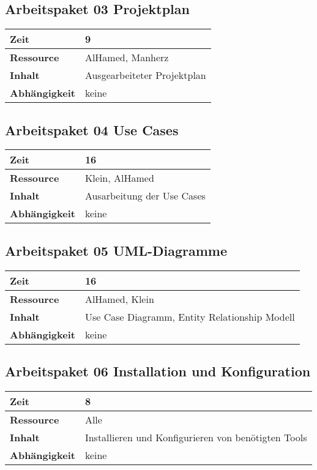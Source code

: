 \documentclass[12pt,a4paper,onecolumn]{article}
\begin{document}
\subsection{Arbeitspaket 03 Projektplan}
\begin{tabularx}{\textwidth}{|l|X|}
\hline
     \textbf{Zeit} &  9\\
     \hline
     \textbf{Ressource} & AlHamed, Manherz\\
     \hline
     \textbf{Inhalt} &  Ausgearbeiteter Projektplan\\
     \hline
     \textbf{Abhängigkeit} & keine\\
\hline
\end{tabularx}

\subsection{Arbeitspaket 04 Use Cases}
\begin{tabularx}{\textwidth}{|l|X|}
\hline
     \textbf{Zeit} &  16\\
     \hline
     \textbf{Ressource} & Klein, AlHamed\\
     \hline
     \textbf{Inhalt} &  Ausarbeitung der Use Cases\\
     \hline
     \textbf{Abhängigkeit} & keine\\
\hline
\end{tabularx}

\subsection{Arbeitspaket 05 UML-Diagramme}
\begin{tabularx}{\textwidth}{|l|X|}
\hline
     \textbf{Zeit} &  16\\
     \hline
     \textbf{Ressource} & AlHamed, Klein\\
     \hline
     \textbf{Inhalt} &  Use Case Diagramm, Entity Relationship Modell\\
     \hline
     \textbf{Abhängigkeit} & keine \\
\hline
\end{tabularx}

\subsection{Arbeitspaket 06 Installation und Konfiguration}
\begin{tabularx}{\textwidth}{|l|X|}
\hline
     \textbf{Zeit} &  8\\
     \hline
     \textbf{Ressource} & Alle\\
     \hline
     \textbf{Inhalt} &  Installieren und Konfigurieren von benötigten Tools\\
     \hline
     \textbf{Abhängigkeit} & keine\\
\hline
\end{tabularx}
\end{document}
